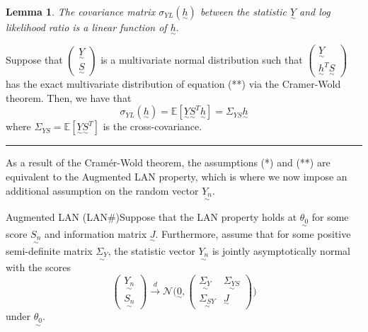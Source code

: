 \documentclass[twoside]{article}
\newtheorem{lemma}[theorem]{Lemma}
\newenvironment{proof}{{\bf Proof:}}{\hfill\rule{2mm}{2mm}}
\newcommand{\utilde}{\underset{\sim}}
\begin{document}
\begin{lemma} The covariance matrix $\sigma_{YL}(\utilde{h})$ between the statistic $\utilde{Y}$ and log likelihood ratio is a linear function of $\utilde{h}.$ 
\end{lemma}

\begin{proof}
Suppose that $\begin{pmatrix}\utilde{Y}\\ \utilde{S} \end{pmatrix}$ is a multivariate normal distribution such that $\begin{pmatrix}\utilde{Y}\\ \utilde{h}^T\utilde{S} \end{pmatrix}$ has the exact multivariate distribution of equation (**) via the Cramer-Wold theorem. Then, we have that
 $$
 \sigma_{YL}(\utilde{h}) = \mathbb{E}[\utilde{Y}\utilde{S}^T\utilde{h}] = \Sigma_{YS}\utilde{h}
 $$
 where $\Sigma_{YS} = \mathbb{E}[\utilde{Y}\utilde{S}^T]$ is the cross-covariance.
\end{proof}

As a result of the Cramér-Wold theorem, the assumptions (*) and (**) are equivalent to the Augmented LAN property, which is where we now impose an additional assumption on the random vector $\utilde{Y_n}.$

\begin{theorem_exam}{Augmented LAN (LAN\#)}{}Suppose that the LAN property holds at $\utilde{\theta_0}$ for some score $\utilde{S_n}$ and information matrix $\utilde{J}$. Furthermore, assume that for some positive semi-definite matrix $\utilde{\Sigma_Y}$, the statistic vector $\utilde{Y_n}$ is jointly asymptotically normal with the scores
$$
\begin{pmatrix}
\utilde{Y_n}\\
\utilde{S_n}
\end{pmatrix}
\xrightarrow{d}
\mathcal{N}\bigg(\utilde{0}, 
\begin{pmatrix}
\utilde{\Sigma_Y} & \utilde{\Sigma_{YS}} \\
\utilde{\Sigma_{SY}} & \utilde{J}
\end{pmatrix}
 \bigg)
$$
under $\utilde{\theta_0}.$
\end{theorem_exam}
\end{document}
